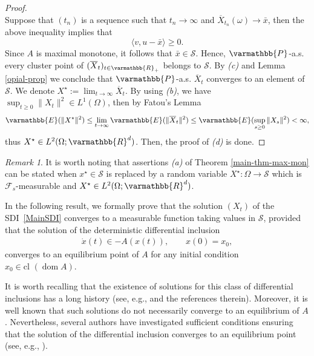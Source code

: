 \documentclass[11pt,reqno]{article}
\let\mathbb=\varmathbb
\newcommand{\R}{\mathbb{R}}
\newcommand{\dom}{\operatorname{dom}}
\newcommand{\cl}{{\text{cl }}}
\newcommand{\1}{\mathds{1}}
\newcommand{\Aver}[2]{\overline{#1}_{#2}}
\numberwithin{equation}{section}  %
\theoremstyle{plain}
\theoremstyle{definition}
\theoremstyle{remark}
\newtheorem{remark}{Remark}
\numberwithin{theorem}{section}
\numberwithin{remark}{section}
\numberwithin{example}{section}
\begin{document}
\begin{proof}
\begin{equation}
    \end{equation}
    Suppose that $(t_n)$ is a sequence such that $t_n\to \infty$ and $\Aver{X}{t_n}(\omega)\to \bar x$, then the above inequality implies that 
    \begin{equation*}
        \langle v,u-\bar x \rangle\geq 0.
    \end{equation*}
    Since $A$ is maximal monotone, it follows that $\bar x\in \mathcal{S}$. Hence, $\mathbb{P}$-a.s. every cluster point of $(\Aver{X}{t})_{t\in \R_+}$ belongs to $\mathcal{S}$. By \emph{(c)} and Lemma \ref{opial-prop}  we conclude that $\mathbb{P}$-a.s. $\Aver{X}{t} $ converges to an element of $\mathcal{S}$. We denote $\displaystyle X^\star:=\lim_{t\to\infty}\Aver{X}{t} $. By using \emph{(b)}, we have $\sup_{t\geq 0}\|X_t\|^2\in L^1(\Omega)$, then by Fatou's Lemma
    \begin{equation*}
        \mathbb{E}(\|X^\star\|^2)\leq \lim_{t\to \infty}\mathbb{E}(\|\Aver{X}{t} \|^2)\leq \mathbb{E}(\sup_{s\geq 0}\|X_s\|^2)<\infty,
    \end{equation*}
    thus $X^\star\in L^2(\Omega;\R^d)$. Then, the proof of \emph{(d)} is done.
    \end{proof}
    
     \begin{remark}\label{F0-measurable-remark}
    	It is worth noting that assertions \emph{(a)} of Theorem \ref{main-thm-max-mon} can be stated when $x^\star\in \mathcal{S}$ is replaced by a random variable $X^\star\colon \Omega\to \mathcal{S}$ which is $\mathcal{F}_s$-measurable and $X^\star\in L^2(\Omega;\R^d)$.
    \end{remark}

In the following result, we formally prove that the solution $(X_t)$ of the SDI~\eqref{MainSDI} converges to a measurable function taking values in $\mathcal{S}$, provided that the solution of the deterministic differential inclusion 
\begin{align}\label{detDS}
    \dot{x}(t) \in -A(x(t)), \qquad x(0) = x_0,
\end{align}
converges to an equilibrium point of $A$ for any initial condition $x_0 \in \cl(\dom A)$. 

It is worth recalling that the existence of solutions for this class of differential inclusions has a long history (see, e.g., \cite{MR755330} and the references therein). Moreover, it is well known that such solutions do not necessarily converge to an equilibrium of $A$. Nevertheless, several authors have investigated sufficient conditions ensuring that the solution of the differential inclusion converges to an equilibrium point (see, e.g., \cite{MR377609,MR477932}). 
\end{document}
